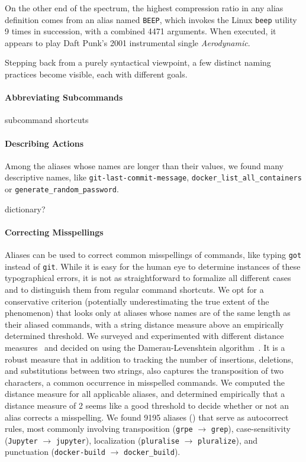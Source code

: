 On the other end of the spectrum, the highest compression ratio in any alias definition comes from an alias named \verb|BEEP|, which invokes the Linux \verb|beep| utility 9 times in succession, with a combined \num{4471} arguments.
When executed, it appears to play Daft Punk's 2001 instrumental single \emph{Aerodynamic}.

Stepping back from a purely syntactical viewpoint, a few distinct naming practices become visible, each with different goals.

\paragraph{\bf Abbreviating Subcommands}

\TODO subcommand shortcuts

\paragraph{\bf Describing Actions}

Among the aliases whose names are longer than their values, we found many descriptive names, like \texttt{git-\allowbreak{}last-\allowbreak{}commit-\allowbreak{}message}, \texttt{docker\_\allowbreak{}list\_\allowbreak{}all\_\allowbreak{}containers} or \texttt{generate\_\allowbreak{}random\_\allowbreak{}password}.

\TODO dictionary?

\paragraph{\bf Correcting Misspellings}

Aliases can be used to correct common misspellings of commands, like typing \verb|got| instead of \verb|git|.
While it is easy for the human eye to determine instances of these typographical errors, it is not as straightforward to formalize all different cases and to distinguish them from regular command shortcuts.
We opt for a conservative criterion (potentially underestimating the true extent of the phenomenon) that looks only at aliases whose names are of the same length as their aliased commands, with a string distance measure above an empirically determined threshold.
We surveyed and experimented with different distance measures~\cite{navarro:01} and decided on using the Damerau-Levenshtein algorithm~\cite{damerau:64}.
It is a robust measure that in addition to tracking the number of insertions, deletions, and substitutions between two strings, also captures the transposition of two characters, a common occurrence in misspelled commands.
We computed the distance measure for all applicable aliases, and determined empirically that a distance measure of 2 seems like a good threshold to decide whether or not an alias corrects a misspelling.
We found \num{9195} aliases () that serve as autocorrect rules, most commonly involving transposition (\verb|grpe| $\rightarrow$ \verb|grep|), case-sensitivity (\verb|Jupyter| $\rightarrow$ \verb|jupyter|), localization (\verb|pluralise| $\rightarrow$ \verb|pluralize|), and punctuation (\verb|docker-build| $\rightarrow$ \verb|docker_build|).

